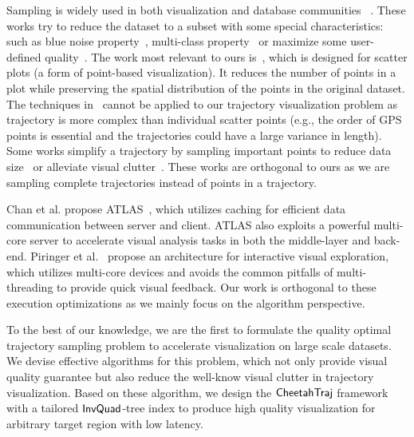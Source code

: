  Sampling is widely used in both visualization and database communities ~\cite{battle2013dynamic,rapp2019void,chen2014visual,yu2020turbocharging,park2016visualization,qin2020making,DBLP:conf/sigmod/DingHCC016,DBLP:journals/pvldb/KimBPIMR15}. These works try to reduce the dataset to a subset with some special characteristics: such as blue noise property~\cite{rapp2019void}, multi-class property~\cite{chen2014visual} or maximize some user-defined quality~\cite{yu2020turbocharging}. The work most relevant to ours is~\cite{park2016visualization}, which is designed for scatter plots (a form of point-based visualization). It reduces the number of points in a plot while preserving the spatial distribution of the points in the original dataset. The techniques in~\cite{park2016visualization} cannot be applied to our trajectory visualization problem
as trajectory is more complex than individual scatter points (e.g., the order of GPS points is essential and the trajectories could have a large variance in length). Some works simplify a trajectory by sampling important points to reduce data size~\cite{zhang2018trajectory,2018arXiv180303550V} or alleviate visual clutter~\cite{borcan2012improving, 6851202}. These works are orthogonal to ours as we are sampling complete trajectories instead of points in a trajectory.

Chan et al. propose ATLAS~\cite{chan2008maintaining}, which utilizes caching for efficient data communication between server and client.
ATLAS also exploits a powerful multi-core server to accelerate visual analysis tasks in both the middle-layer and back-end.
Piringer et al.~\cite{piringer2009multi} propose an architecture for interactive visual exploration,
which utilizes multi-core devices and avoids the common pitfalls of multi-threading to provide quick visual feedback.
Our work is orthogonal to these execution optimizations as we mainly focus on the algorithm perspective.

 To the best of our knowledge, we are the first to formulate the quality optimal trajectory sampling problem to accelerate visualization on large scale datasets. We devise effective algorithms for this problem, which not only provide visual quality guarantee but also reduce the well-know visual clutter in trajectory visualization. Based on these algorithm, we design the $\mathsf{CheetahTraj}$ framework with a tailored $\mathsf{InvQuad}$-tree index to produce high quality visualization for arbitrary target region with low latency.

